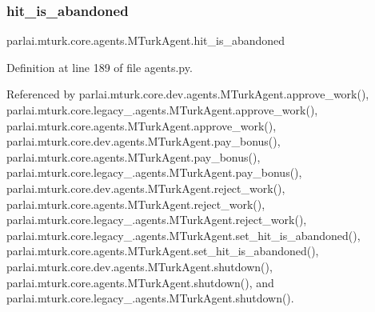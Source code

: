 \mbox{\label{classparlai_1_1mturk_1_1core_1_1agents_1_1MTurkAgent_ababed43ee0e082b71a7b73c82de44782}} 
\subsubsection{\texorpdfstring{hit\+\_\+is\+\_\+abandoned}{hit\_is\_abandoned}}
{\footnotesize\ttfamily parlai.\+mturk.\+core.\+agents.\+M\+Turk\+Agent.\+hit\+\_\+is\+\_\+abandoned}



Definition at line 189 of file agents.\+py.



Referenced by parlai.\+mturk.\+core.\+dev.\+agents.\+M\+Turk\+Agent.\+approve\+\_\+work(), parlai.\+mturk.\+core.\+legacy\+\_.\+agents.\+M\+Turk\+Agent.\+approve\+\_\+work(), parlai.\+mturk.\+core.\+agents.\+M\+Turk\+Agent.\+approve\+\_\+work(), parlai.\+mturk.\+core.\+dev.\+agents.\+M\+Turk\+Agent.\+pay\+\_\+bonus(), parlai.\+mturk.\+core.\+agents.\+M\+Turk\+Agent.\+pay\+\_\+bonus(), parlai.\+mturk.\+core.\+legacy\+\_.\+agents.\+M\+Turk\+Agent.\+pay\+\_\+bonus(), parlai.\+mturk.\+core.\+dev.\+agents.\+M\+Turk\+Agent.\+reject\+\_\+work(), parlai.\+mturk.\+core.\+agents.\+M\+Turk\+Agent.\+reject\+\_\+work(), parlai.\+mturk.\+core.\+legacy\+\_.\+agents.\+M\+Turk\+Agent.\+reject\+\_\+work(), parlai.\+mturk.\+core.\+legacy\+\_.\+agents.\+M\+Turk\+Agent.\+set\+\_\+hit\+\_\+is\+\_\+abandoned(), parlai.\+mturk.\+core.\+agents.\+M\+Turk\+Agent.\+set\+\_\+hit\+\_\+is\+\_\+abandoned(), parlai.\+mturk.\+core.\+dev.\+agents.\+M\+Turk\+Agent.\+shutdown(), parlai.\+mturk.\+core.\+agents.\+M\+Turk\+Agent.\+shutdown(), and parlai.\+mturk.\+core.\+legacy\+\_.\+agents.\+M\+Turk\+Agent.\+shutdown().

\mbox{\label{classparlai_1_1mturk_1_1core_1_1agents_1_1MTurkAgent_a0c5cd20df0106fd8f6605f03b6654ede}} 
